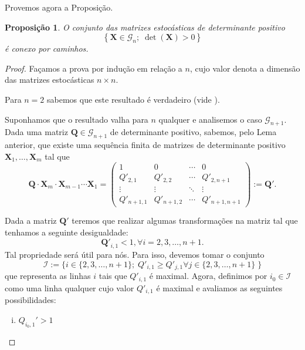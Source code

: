 \documentclass[twoside,openright,titlepage,numbers=noenddot,headinclude,  lineheaders footinclude=true,cleardoublepage=empty,
                                BCOR=5mm,paper=a4,fontsize=12pt ]{scrbook}
\newtheorem*{prop*}{Proposição}
\theoremstyle{definition}
\begin{document}
Provemos agora a Proposição.
\begin{prop*}
O conjunto das matrizes estocásticas de determinante positivo
\[
\left\{ \mathbf{X} \in \mathcal{G}_n; \; \det(\mathbf{X}) > 0 \right\}
\]
é conexo por caminhos.
\end{prop*}


\begin{proof}
Façamos a prova por indução em relação a $n$, cujo valor
denota a dimensão das matrizes estocásticas $n \times n$. 

Para $ n = 2$ sabemos que este 
resultado é verdadeiro (vide \cite{paper1}).

Suponhamos que o resultado valha para $n$ qualquer e 
analisemos o caso $\mathcal{G}_{n+1}$. 
Dada uma matriz $\mathbf{Q} \in \mathcal{G}_{n+1}$
de determinante positivo, sabemos, pelo Lema anterior,
 que  existe uma sequência finita
de matrizes de determinante positivo $\mathbf{X}_1, \ldots,
\mathbf{X}_m$ tal que
\[
\mathbf{Q} \cdot \mathbf{X}_m \cdot \mathbf{X}_{m-1}  \cdots
 \mathbf{X}_1 = 
\begin{pmatrix}
1 & 0 & \cdots & 0\\
Q'_{2,1} & Q'_{2,2} & \cdots & Q'_{2,n+1}\\
\vdots & \vdots & \ddots & \vdots\\
Q'_{n+1,1} & Q'_{n+1,2} & \cdots & Q'_{n+1,n+1}
\end{pmatrix}
:= \mathbf{Q'}.
\]

Dada a matriz $\mathbf{Q'}$ teremos que realizar algumas 
transformações na matriz tal que tenhamos a
 seguinte desigualdade:
\[
\mathbf{Q'}_{i,1} < 1, \forall i = 2, 3, \ldots, n+1.
\]
Tal propriedade será útil para nós. Para isso, 
devemos tomar o conjunto
\[
\mathcal{I} := \{ i \in \{2, 3, \ldots, n+1\}; \;
Q'_{i,1} \geq Q'_{j,1} \forall j \in \{2, 3, \ldots, n+1\}\;\}
\]
que representa as linhas $i$ tais que $Q'_{i,1}$ é maximal.
Agora, definimos por $i_0 \in \mathcal{I}$ como uma linha qualquer
cujo valor $Q'_{i,1}$ é maximal
e avaliamos as seguintes possibilidades:
\begin{enumerate}[(i)]
\item $ Q_{i_0,1}' > 1$


\end{enumerate}
\end{proof}
\end{document}
